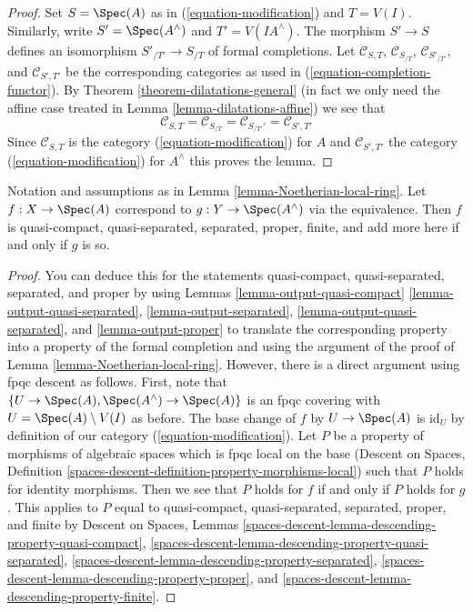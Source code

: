 \begin{proof}
Set $S = \Spec(A)$ as in (\ref{equation-modification}) and $T = V(I)$.
Similarly, write $S' = \Spec(A^\wedge)$ and $T' = V(IA^\wedge)$.
The morphism $S' \to S$ defines an isomorphism $S'_{/T'} \to S_{/T}$
of formal completions. Let $\mathcal{C}_{S, T}$, $\mathcal{C}_{S_{/T}}$,
$\mathcal{C}_{S'_{/T'}}$, and $\mathcal{C}_{S', T'}$ be the corresponding
categories as used in (\ref{equation-completion-functor}).
By Theorem \ref{theorem-dilatations-general} (in fact we only need
the affine case treated in Lemma \ref{lemma-dilatations-affine})
we see that
$$
\mathcal{C}_{S, T} = \mathcal{C}_{S_{/T}} =
\mathcal{C}_{S_{/T'}'} = \mathcal{C}_{S', T'}
$$
Since $\mathcal{C}_{S, T}$ is the category (\ref{equation-modification})
for $A$ and $\mathcal{C}_{S', T'}$ the category (\ref{equation-modification})
for $A^\wedge$ this proves the lemma.
\end{proof}

\begin{lemma}
\label{lemma-Noetherian-local-ring-properties}
Notation and assumptions as in Lemma \ref{lemma-Noetherian-local-ring}.
Let $f : X \to \Spec(A)$ correspond to $g : Y \to \Spec(A^\wedge)$
via the equivalence. Then $f$ is quasi-compact, quasi-separated, separated,
proper, finite, and add more here if and only if $g$ is so.
\end{lemma}

\begin{proof}
You can deduce this for the statements
quasi-compact, quasi-separated, separated, and proper
by using Lemmas \ref{lemma-output-quasi-compact}
\ref{lemma-output-quasi-separated},
\ref{lemma-output-separated},
\ref{lemma-output-quasi-separated}, and
\ref{lemma-output-proper}
to translate the corresponding property into a property
of the formal completion and using the argument of the proof
of Lemma \ref{lemma-Noetherian-local-ring}.
However, there is a direct argument using fpqc descent as follows.
First, note that $\{U \to \Spec(A), \Spec(A^\wedge) \to \Spec(A)\}$ is an
fpqc covering with $U = \Spec(A) \setminus V(I)$ as before.
The base change of $f$ by $U \to \Spec(A)$ is $\text{id}_U$
by definition of our category (\ref{equation-modification}).
Let $P$ be a property of morphisms of algebraic spaces which
is fpqc local on the base (Descent on Spaces, Definition
\ref{spaces-descent-definition-property-morphisms-local})
such that $P$ holds for identity morphisms.
Then we see that $P$ holds for $f$ if and only if $P$ holds for $g$.
This applies to $P$ equal to
quasi-compact, quasi-separated, separated, proper, and finite
by
Descent on Spaces, Lemmas
\ref{spaces-descent-lemma-descending-property-quasi-compact},
\ref{spaces-descent-lemma-descending-property-quasi-separated},
\ref{spaces-descent-lemma-descending-property-separated},
\ref{spaces-descent-lemma-descending-property-proper}, and
\ref{spaces-descent-lemma-descending-property-finite}.
\end{proof}

